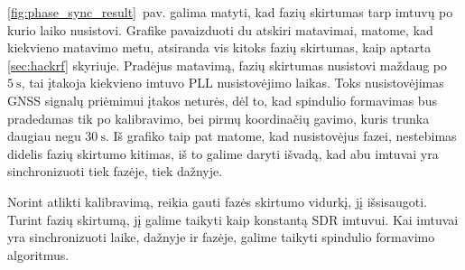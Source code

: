 \documentclass[main.tex]{subfiles}
\begin{document}
\ref{fig:phase_sync_result}~pav. galima matyti, kad fazių skirtumas tarp
imtuvų po kurio laiko nusistovi. Grafike pavaizduoti du atskiri matavimai,
matome, kad kiekvieno matavimo metu, atsiranda vis kitoks fazių skirtumas,
kaip aptarta \ref{sec:hackrf} skyriuje.
Pradėjus matavimą, fazių skirtumas nusistovi maždaug po $5\ \mathrm{s}$, tai
įtakoja kiekvieno imtuvo PLL nusistovėjimo laikas. Toks nusistovėjimas
GNSS signalų priėmimui įtakos neturės, dėl to, kad spindulio formavimas
bus pradedamas tik po kalibravimo, bei pirmų koordinačių gavimo,
kuris trunka daugiau negu $30\ \mathrm{s}$.
Iš grafiko taip pat matome, kad nusistovėjus fazei, nestebimas didelis fazių skirtumo
kitimas, iš to galime daryti išvadą, kad abu imtuvai yra sinchronizuoti tiek fazėje,
tiek dažnyje.

Norint atlikti kalibravimą, reikia gauti fazės skirtumo vidurkį, jį išsisaugoti.
Turint fazių skirtumą, jį galime taikyti kaip konstantą SDR imtuvui. Kai imtuvai
yra sinchronizuoti laike, dažnyje ir fazėje, galime taikyti spindulio formavimo
algoritmus.
\end{document}
